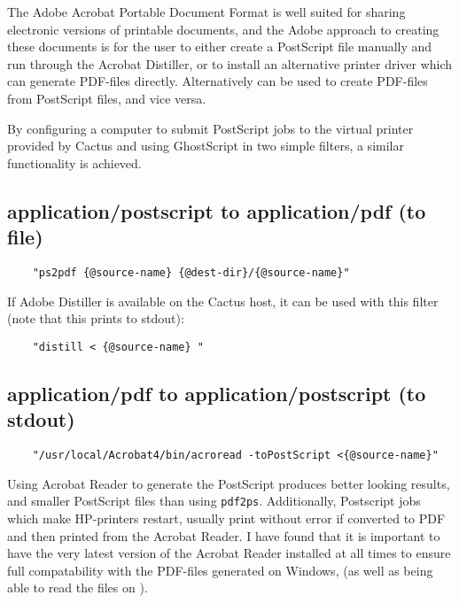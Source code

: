 The Adobe Acrobat Portable Document Format is well suited for sharing
electronic versions of printable documents, and the Adobe approach to
creating these documents is for the user to either create a PostScript
file manually and run through the Acrobat Distiller, or to install an
alternative printer driver which can generate PDF-files directly.
Alternatively  can be used to create PDF-files from PostScript files, and
vice versa.

By configuring a computer to submit PostScript jobs to the virtual
printer provided by Cactus and using GhostScript in two simple filters,
a similar functionality is achieved.

\subsection*{application/postscript to application/pdf (to file)}

\begin{verbatim}
    "ps2pdf {@source-name} {@dest-dir}/{@source-name}"
\end{verbatim}

If Adobe Distiller is available on the Cactus host, it can be used
with this filter (note that this prints to stdout):

\begin{verbatim}
    "distill < {@source-name} "
\end{verbatim}


\subsection*{application/pdf to application/postscript (to stdout)}

\begin{verbatim}
    "/usr/local/Acrobat4/bin/acroread -toPostScript <{@source-name}"
\end{verbatim}

Using Acrobat Reader to generate the PostScript produces better
looking results, and smaller PostScript files than using
\texttt{pdf2ps}.  Additionally, Postscript jobs which make HP-printers
restart, usually print without error if converted to PDF and then
printed from the Acrobat Reader.  I have found that it is important to
have the very latest version of the Acrobat Reader installed at all
times to ensure full compatability with the PDF-files generated on
Windows, (as well as being able to read the files on
).

